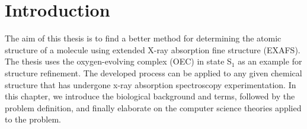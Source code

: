 \chapter{Introduction}

The aim of this thesis is to find a better method for determining the atomic structure of a molecule using extended X-ray absorption fine structure (EXAFS). The thesis uses the oxygen-evolving complex (OEC) in state S$_{1}$ as an example for structure refinement. The developed process can be applied to any given chemical structure that has undergone x-ray absorption spectroscopy experimentation. In this chapter, we introduce the biological background and terms, followed by the problem definition, and finally elaborate on the computer science theories applied to the problem.





